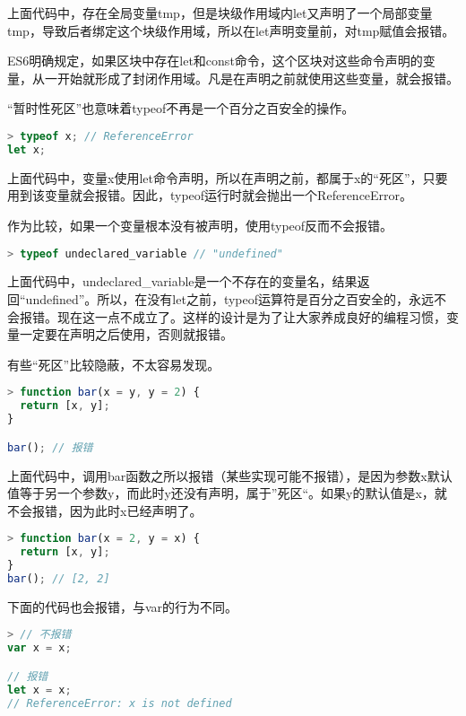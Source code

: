 上面代码中，存在全局变量tmp，但是块级作用域内let又声明了一个局部变量tmp，导致后者绑定这个块级作用域，所以在let声明变量前，对tmp赋值会报错。

ES6明确规定，如果区块中存在let和const命令，这个区块对这些命令声明的变量，从一开始就形成了封闭作用域。凡是在声明之前就使用这些变量，就会报错。

“暂时性死区”也意味着typeof不再是一个百分之百安全的操作。

\begin{lstlisting}[language=JavaScript]
> typeof x; // ReferenceError
let x;
\end{lstlisting}


上面代码中，变量x使用let命令声明，所以在声明之前，都属于x的“死区”，只要用到该变量就会报错。因此，typeof运行时就会抛出一个ReferenceError。

作为比较，如果一个变量根本没有被声明，使用typeof反而不会报错。

\begin{lstlisting}[language=JavaScript]
> typeof undeclared_variable // "undefined"
\end{lstlisting}

上面代码中，undeclared\_variable是一个不存在的变量名，结果返回“undefined”。所以，在没有let之前，typeof运算符是百分之百安全的，永远不会报错。现在这一点不成立了。这样的设计是为了让大家养成良好的编程习惯，变量一定要在声明之后使用，否则就报错。

有些“死区”比较隐蔽，不太容易发现。

\begin{lstlisting}[language=JavaScript]
> function bar(x = y, y = 2) {
  return [x, y];
}

bar(); // 报错
\end{lstlisting}

上面代码中，调用bar函数之所以报错（某些实现可能不报错），是因为参数x默认值等于另一个参数y，而此时y还没有声明，属于”死区“。如果y的默认值是x，就不会报错，因为此时x已经声明了。

\begin{lstlisting}[language=JavaScript]
> function bar(x = 2, y = x) {
  return [x, y];
}
bar(); // [2, 2]
\end{lstlisting}


下面的代码也会报错，与var的行为不同。

\begin{lstlisting}[language=JavaScript]
> // 不报错
var x = x;

// 报错
let x = x;
// ReferenceError: x is not defined
\end{lstlisting}


